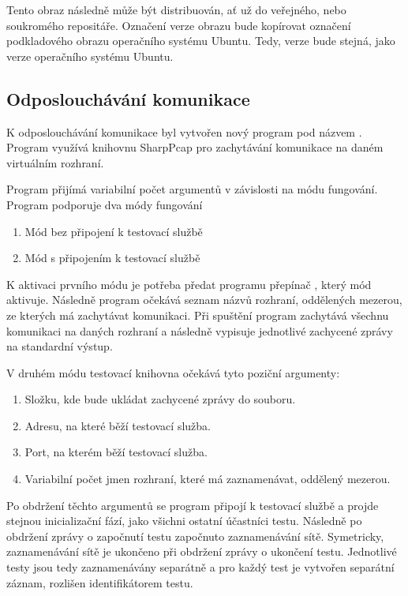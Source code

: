 Tento obraz následně může být distribuován, ať už do veřejného, nebo soukromého repositáře. Označení verze obrazu bude kopírovat označení podkladového obrazu operačního systému Ubuntu. Tedy, verze bude stejná, jako verze operačního systému Ubuntu. 

\subsection{Odposlouchávání komunikace}

K odposlouchávání komunikace byl vytvořen nový program pod názvem . Program využívá knihovnu SharpPcap\cite{sharppcap} pro zachytávání komunikace na daném virtuálním rozhraní. 

Program přijímá variabilní počet argumentů v závislosti na módu fungování. Program podporuje dva módy fungování

\begin{enumerate}
    \item Mód bez připojení k testovací službě
    \item Mód s připojením k testovací službě
\end{enumerate}

K aktivaci prvního módu je potřeba předat programu přepínač , který mód aktivuje. Následně program očekává seznam názvů rozhraní, oddělených mezerou, ze kterých má zachytávat komunikaci. Při spuštění program zachytává všechnu komunikaci na daných rozhraní a následně vypisuje jednotlivé zachycené zprávy na standardní výstup.

V druhém módu testovací knihovna očekává tyto poziční argumenty:

\begin{enumerate}
    \item Složku, kde bude ukládat zachycené zprávy do souboru.
    \item Adresu, na které běží testovací služba.
    \item Port, na kterém běží testovací služba.
    \item Variabilní počet jmen rozhraní, které má zaznamenávat, oddělený mezerou.
\end{enumerate}

Po obdržení těchto argumentů se program připojí k testovací službě a projde stejnou inicializační fází, jako všichni ostatní účastníci testu. Následně po obdržení zprávy o započnutí testu započnuto zaznamenávání sítě. Symetricky, zaznamenávání sítě je ukončeno při obdržení zprávy o ukončení testu. Jednotlivé testy jsou tedy zaznamenávány separátně a pro každý test je vytvořen separátní záznam, rozlišen identifikátorem testu.

